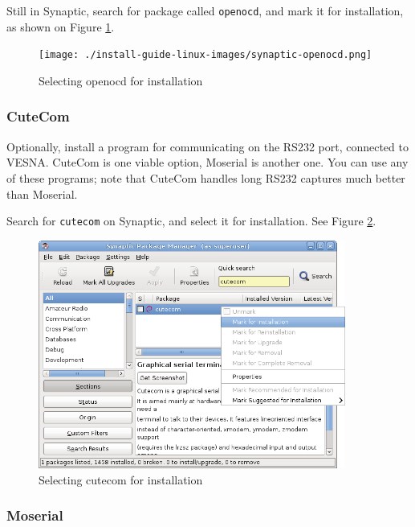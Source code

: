 \documentclass[a4paper, 10pt]{article}
\begin{document}
Still in Synaptic, search for package called \verb+openocd+,
and mark it for installation, as shown on Figure \ref{fig:synaptic-openocd}.


    \begin{figure}[H]
    \centering
        \texttt{[image: ./install-guide-linux-images/synaptic-openocd.png]}
        \caption{Selecting openocd for installation}
        \label{fig:synaptic-openocd}
    \end{figure}


\subsubsection{CuteCom}

Optionally, install a program for communicating on the RS232 port,
connected to VESNA.
CuteCom is one viable option, Moserial is another one.
You can use any of these programs; note that CuteCom handles long
RS232 captures much better than Moserial.

Search for \verb+cutecom+ on Synaptic, and select it for installation.
See Figure \ref{fig:synaptic-cutecom}.

    \begin{figure}[H]
    \centering
        \includegraphics[width=0.9\textwidth]{./install-guide-linux-images/synaptic-cutecom.png}
        \caption{Selecting cutecom for installation}
        \label{fig:synaptic-cutecom}
    \end{figure}

\subsubsection{Moserial}
\end{document}
